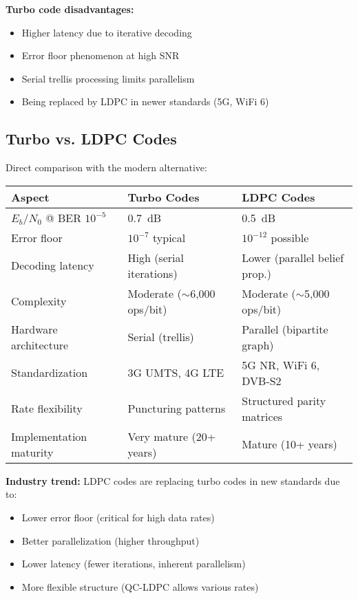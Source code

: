 \textbf{Turbo code disadvantages:}
\begin{itemize}
\item Higher latency due to iterative decoding
\item Error floor phenomenon at high SNR
\item Serial trellis processing limits parallelism
\item Being replaced by LDPC in newer standards (5G, WiFi 6)
\end{itemize}

\subsection{Turbo vs. LDPC Codes}

Direct comparison with the modern alternative:

\begin{center}
\begin{tabular}{@{}lll@{}}
\toprule
Aspect & Turbo Codes & LDPC Codes \\
\midrule
$E_b/N_0$ @ BER $10^{-5}$ & 0.7~dB & 0.5~dB \\
Error floor & $10^{-7}$ typical & $10^{-12}$ possible \\
Decoding latency & High (serial iterations) & Lower (parallel belief prop.) \\
Complexity & Moderate ($\sim$6,000 ops/bit) & Moderate ($\sim$5,000 ops/bit) \\
Hardware architecture & Serial (trellis) & Parallel (bipartite graph) \\
Standardization & 3G UMTS, 4G LTE & 5G NR, WiFi 6, DVB-S2 \\
Rate flexibility & Puncturing patterns & Structured parity matrices \\
Implementation maturity & Very mature (20+ years) & Mature (10+ years) \\
\bottomrule
\end{tabular}
\end{center}

\textbf{Industry trend:} LDPC codes are replacing turbo codes in new standards due to:
\begin{itemize}
\item Lower error floor (critical for high data rates)
\item Better parallelization (higher throughput)
\item Lower latency (fewer iterations, inherent parallelism)
\item More flexible structure (QC-LDPC allows various rates)
\end{itemize}

